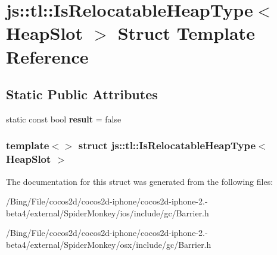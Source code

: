 \hypertarget{structjs_1_1tl_1_1_is_relocatable_heap_type_3_01_heap_slot_01_4}{\section{js\-:\-:tl\-:\-:Is\-Relocatable\-Heap\-Type$<$ Heap\-Slot $>$ Struct Template Reference}
\label{structjs_1_1tl_1_1_is_relocatable_heap_type_3_01_heap_slot_01_4}
}
\subsection*{Static Public Attributes}
\begin{DoxyCompactItemize}
\item 
\hypertarget{structjs_1_1tl_1_1_is_relocatable_heap_type_3_01_heap_slot_01_4_ab57903e948f8b235aed80eb8b75bb1cf}{static const bool {\bfseries result} = false}\label{structjs_1_1tl_1_1_is_relocatable_heap_type_3_01_heap_slot_01_4_ab57903e948f8b235aed80eb8b75bb1cf}

\end{DoxyCompactItemize}
\subsubsection*{template$<$$>$ struct js\-::tl\-::\-Is\-Relocatable\-Heap\-Type$<$ Heap\-Slot $>$}



The documentation for this struct was generated from the following files\-:\begin{DoxyCompactItemize}
\item 
/\-Bing/\-File/cocos2d/cocos2d-\/iphone/cocos2d-\/iphone-\/2.-\/beta4/external/\-Spider\-Monkey/ios/include/gc/Barrier.\-h\item 
/\-Bing/\-File/cocos2d/cocos2d-\/iphone/cocos2d-\/iphone-\/2.-\/beta4/external/\-Spider\-Monkey/osx/include/gc/Barrier.\-h\end{DoxyCompactItemize}
